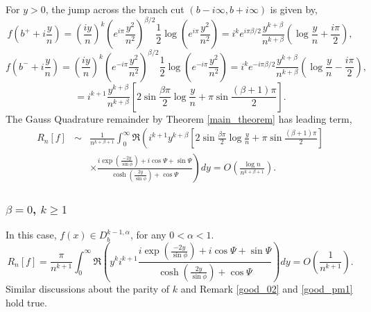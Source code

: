 \documentclass[11pt]{article}
\begin{document}
For $y>0$, the jump across the branch cut $(b-i\infty,b+i\infty)$ is given by,
\begin{equation}
    f(b^++i\frac{y}{n}) = (\frac{iy}{n})^k (e^{i\pi}\frac{y^2}{n^2})^{\beta/2} \frac{1}{2} \log (e^{i\pi}\frac{y^2}{n^2}) = i^k e^{i\pi\beta/2} \frac{y^{k+\beta}}{n^{k+\beta}} (\log \frac{y}{n} + \frac{i\pi}{2}),
\end{equation}
\begin{equation}
    f(b^-+i\frac{y}{n}) = (\frac{iy}{n})^k (e^{-i\pi}\frac{y^2}{n^2})^{\beta/2} \frac{1}{2} \log (e^{-i\pi}\frac{y^2}{n^2}) = i^k e^{-i\pi\beta/2} \frac{y^{k+\beta}}{n^{k+\beta}} (\log \frac{y}{n}- \frac{i\pi}{2}),
\end{equation}
\begin{equation}
    [f(b+i\frac{y}{n})] = i^{k+1} \frac{y^{k+\beta}}{n^{k+\beta}} \left[2 \sin\frac{\beta \pi}{2} \log \frac{y}{n} + \pi \sin\frac{(\beta+1) \pi}{2}  \right].
\end{equation}
The Gauss Quadrature remainder by Theorem \ref{main_theorem} has leading term,
\begin{eqnarray}
    R_n[f] &\sim& \frac{1}{ n^{k+\beta+1}}\int_{0}^{\infty} \Re \left(i^{k+1} y^{k+\beta} \left[2 \sin \frac{\beta \pi}{2}\log \frac{y}{n} + \pi \sin \frac{(\beta+1)\pi}{2}\right] \right.\nonumber\\ && \left.\times \frac{  i\exp\left(\frac{-2y}{\sin\phi}\right) + i\cos \Psi + \sin \Psi  }{\cosh\left(\frac{2y}{\sin\phi}\right) + \cos \Psi}\right)dy= O(\frac{\log n}{n^{k+\beta+1}}). \label{betaneq0}
\end{eqnarray}

\subsubsection{$\beta = 0$, $k\geq 1$} In this case, $f(x) \in D_b^{k-1,\alpha}$, for any $0<\alpha<1$.
\begin{equation}
        R_n[f] = \frac{\pi}{ n^{k+1}}\int_{0}^{\infty}\Re\left( y^{k} i^{k+1} \frac{  i\exp\left(\frac{-2y}{\sin\phi}\right) + i\cos \Psi + \sin \Psi  }{\cosh\left(\frac{2y}{\sin\phi}\right) + \cos \Psi} \right)dy = O(\frac{1}{n^{k+1}}). \label{beta =0}
    \end{equation}
Similar discussions about the parity of $k$ and Remark \ref{good_02} and \ref{good_pm1} hold true.
\end{document}
